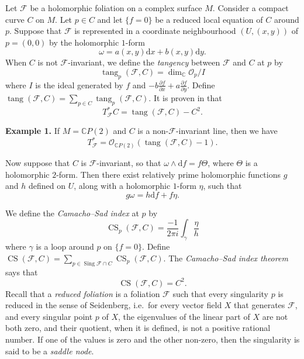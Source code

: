 \documentclass[british]{article}
\newenvironment{rmenv}[1]
  {\phantomsection\par\smallskip\noindent\textbf{#1.}\rmfamily}
  {\par\smallskip}
\newcommand{\oldpage}[1]{\marginpar{\footnotesize$\Big\vert$ \textit{p.~#1}}}
\begin{document}
Let \({\mathcal{F}}\) be a holomorphic foliation on a complex surface
\(M\). Consider a compact curve \(C\) on \(M\). \oldpage{49} Let
\(p\in C\) and let \(\{f=0\}\) be a reduced local equation of \(C\)
around \(p\). Suppose that \({\mathcal{F}}\) is represented in a
coordinate neighbourhood \((U,(x,y))\) of \(p=(0,0)\) by the holomorphic
\(1\)-form \[
  \omega
  = a(x,y)\mathrm{d}{x} + b(x,y) \mathrm{d}{y}.
\] When \(C\) is not \({\mathcal{F}}\)-invariant, we define the
\emph{tangency} between \({\mathcal{F}}\) and \(C\) at \(p\) by \[
  \operatorname{tang}_p({\mathcal{F}},C)=\dim_\mathbb{C}{\mathcal{O}}_p/I
\] where \(I\) is the ideal generated by \(f\) and
\(-b\frac{\partial f}{\partial x}+a\frac{\partial f}{\partial y}\).
Define
\(\operatorname{tang}({\mathcal{F}},C)=\sum_{p\in C}\operatorname{tang}_p({\mathcal{F}},C)\).
It is proven in \autocite{2} that \[
  T_{\mathcal{F}}^*C
  = \operatorname{tang}({\mathcal{F}},C) - C^2.
\]

\protect{}\label{example-1}
\begin{rmenv}{Example 1}
If \(M=\mathbb{C}P(2)\) and \(C\) is a non-\({\mathcal{F}}\)-invariant
line, then we have \[
  T_{\mathcal{F}}^*
  = {\mathcal{O}}_{\mathbb{C}P(2)}(\operatorname{tang}({\mathcal{F}},C)-1).
\]

\end{rmenv}

Now suppose that \(C\) is \({\mathcal{F}}\)-invariant, so that
\(\omega\wedge\mathrm{d}{f}=f\Theta\), where \(\Theta\) is a holomorphic
\(2\)-form. Then there exist relatively prime holomorphic functions
\(g\) and \(h\) defined on \(U\), along with a holomorphic \(1\)-form
\(\eta\), such that \[
  g\omega
  = h\mathrm{d}{f} + f\eta.
\]

We define the \emph{Camacho--Sad index} at \(p\) by \[
  \operatorname{CS}_p({\mathcal{F}},C)
  = \frac{-1}{2\pi i}\int_\gamma\frac{\eta}{h}
\] where \(\gamma\) is a loop around \(p\) on \(\{f=0\}\). Define
\(\operatorname{CS}({\mathcal{F}},C)=\sum_{p\in\operatorname{Sing}{\mathcal{F}}\cap C}\operatorname{CS}_p({\mathcal{F}},C)\).
The \emph{Camacho--Sad index theorem} \autocite{5} says that \[
  \operatorname{CS}({\mathcal{F}},C)
  = C^2.
\] Recall that a \emph{reduced foliation} is a foliation
\({\mathcal{F}}\) such that every singularity \(p\) is reduced in the
sense of Seidenberg, i.e.~for every vector field \(X\) that generates
\({\mathcal{F}}\), and every singular point \(p\) of \(X\), the
eigenvalues of the linear part of \(X\) are not both zero, and their
quotient, when it is defined, is not a positive rational number. If one
of the values is zero and the other non-zero, then the singularity is
said to be a \emph{saddle node}.
\end{document}
